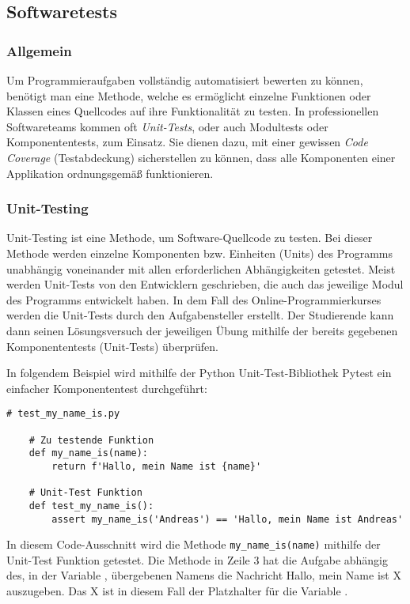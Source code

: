\subsection{Softwaretests}
\subsubsection{Allgemein}
Um Programmieraufgaben vollständig automatisiert bewerten zu können, benötigt
man eine Methode, welche es ermöglicht einzelne Funktionen oder Klassen eines
Quellcodes auf ihre Funktionalität zu testen. In professionellen Softwareteams
kommen oft \emph{Unit-Tests}, oder auch Modultests oder Komponententests, zum
Einsatz. Sie dienen dazu, mit einer gewissen \emph{Code Coverage}
(Testabdeckung) sicherstellen zu können, dass alle Komponenten einer Applikation
ordnungsgemäß funktionieren.

\subsubsection{Unit-Testing}
Unit-Testing ist eine Methode, um Software-Quellcode zu testen. Bei dieser
Methode werden einzelne Komponenten bzw. Einheiten (Units) des Programms
unabhängig voneinander mit allen erforderlichen Abhängigkeiten getestet. Meist
werden Unit-Tests von den Entwicklern geschrieben, die auch das jeweilige
Modul des Programms entwickelt haben. In dem Fall des Online-Programmierkurses
werden die Unit-Tests durch den Aufgabensteller erstellt. Der Studierende kann
dann seinen Lösungsversuch der jeweiligen Übung mithilfe der bereits gegebenen
Komponententests (Unit-Tests) überprüfen. \parencite{unit-test}

In folgendem Beispiel wird mithilfe der Python Unit-Test-Bibliothek Pytest
ein einfacher Komponententest durchgeführt:

\begin{lstlisting}[style=Python]
    # test_my_name_is.py

    # Zu testende Funktion
    def my_name_is(name):
        return f'Hallo, mein Name ist {name}'

    # Unit-Test Funktion
    def test_my_name_is():
        assert my_name_is('Andreas') == 'Hallo, mein Name ist Andreas'
\end{lstlisting}

In diesem Code-Ausschnitt wird die Methode \texttt{my\_name\_is(name)} mithilfe
der Unit-Test Funktion  getestet. Die Methode 
 in Zeile 3 hat die Aufgabe abhängig des, in der
Variable , übergebenen Namens die Nachricht \glqq Hallo, mein Name
ist X\grqq{} auszugeben. Das X ist in diesem Fall der Platzhalter für die
Variable .

